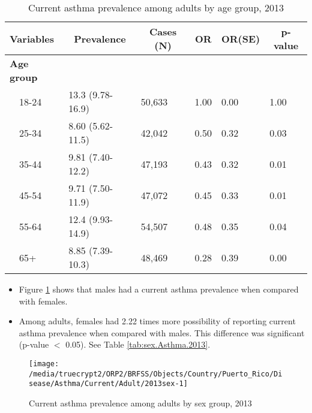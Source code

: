\begin{table}[H]
\caption{Current asthma prevalence  among adults by age group, 2013\label{tab:age.Asthma.2013}} 
\begin{center}
\begin{tabular}{llllll}
\hline\hline
\multicolumn{1}{l}{Variables}&\multicolumn{1}{c}{Prevalence}&\multicolumn{1}{c}{Cases (N)}&\multicolumn{1}{c}{OR}&\multicolumn{1}{c}{OR(SE)}&\multicolumn{1}{c}{p-value}\tabularnewline
\hline
{\bfseries Age group}&&&&&\tabularnewline
~~18-24&13.3 (9.78-16.9)&50,633&1.00&0.00&1.00\tabularnewline
~~25-34&8.60 (5.62-11.5)&42,042&0.50&0.32&0.03\tabularnewline
~~35-44&9.81 (7.40-12.2)&47,193&0.43&0.32&0.01\tabularnewline
~~45-54&9.71 (7.50-11.9)&47,072&0.45&0.33&0.01\tabularnewline
~~55-64&12.4 (9.93-14.9)&54,507&0.48&0.35&0.04\tabularnewline
~~65+&8.85 (7.39-10.3)&48,469&0.28&0.39&0.00\tabularnewline
\hline
\end{tabular}\end{center}

\end{table}


\newpage
\begin{itemize}

\item Figure \ref{fig:sex.Asthma.2013} shows that males had a 
current asthma prevalence when compared with females.


\item Among adults, females had 2.22 times more possibility of reporting current asthma prevalence when compared with males. This difference was significant (p-value $<$ 0.05). See Table \ref{tab:sex.Asthma.2013}.

\end{itemize}

\begin{figure}[H]
\caption{Current asthma prevalence among adults by sex group, 
2013}
\begin{knitrout}
\color{fgcolor}

{\centering \texttt{[image: /media/truecrypt2/ORP2/BRFSS/Objects/Country/Puerto\_Rico/Disease/Asthma/Current/Adult/2013sex-1]} 

}



\end{knitrout}
\label{fig:sex.Asthma.2013}
\end{figure}


